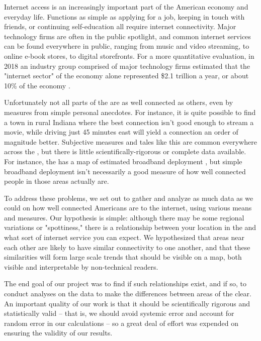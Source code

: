 Internet access is an increasingly important part of the American economy and everyday life. Functions as simple as applying for a job, keeping in touch with friends, or continuing self-education all require internet connectivity. Major technology firms are often in the public spotlight, and common internet services can be found everywhere in public, ranging from music and video streaming, to online e-book stores, to digital storefronts. For a more quantitative evaluation, in 2018 an industry group comprised of major technology firms estimated that the "internet sector" of the economy alone represented \$2.1 trillion a year, or about 10\% of the \us economy \cite{Shepardson2019InternetGroup}.

Unfortunately not all parts of the \us are as well connected as others, even by measures from simple personal anecdotes. For instance, it is  quite possible to find a town in rural Indiana where the best connection isn't good enough to stream a movie, while driving just 45 minutes east will yield a connection an order of magnitude better. Subjective measures and tales like this are common everywhere across the \us, but there is little scientifically-rigorous or complete data available. For instance, the \fcc has a map of estimated broadband deployment \cite{FederalCommunicationsCommission}, but simple broadband deployment isn't necessarily a good measure of how well connected people in those areas actually are.

To address these problems, we set out to gather and analyze as much data as we could on how well connected Americans are to the internet, using various means and measures. Our hypothesis is simple: although there may be some regional variations or "spottiness," there is a relationship between your location in the \us and what sort of internet service you can expect. We hypothesized that areas near each other are likely to have similar connectivity to one another, and that these similarities will form large scale trends that should be visible on a map, both visible and interpretable by non-technical readers.

The end goal of our project was to find if such relationships exist, and if so, to conduct analyses on the data to make the differences between areas of the \us clear. An important quality of our work is that it should be scientifically rigorous and statistically valid -- that is, we should avoid systemic error and account for random error in our calculations -- so a great deal of effort was expended on ensuring the validity of our results.

